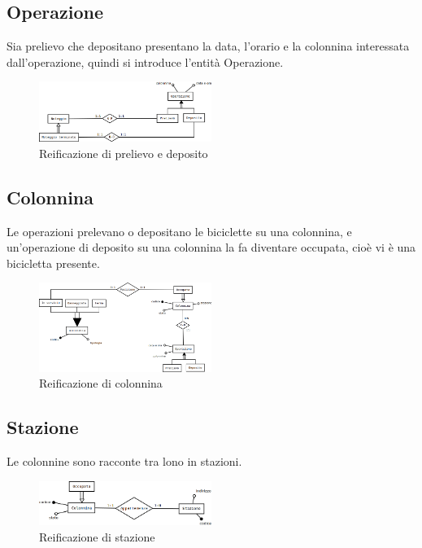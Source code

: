 \documentclass[a4paper,twoside]{article}
\begin{document}
\subsection{Operazione}
Sia prelievo che depositano presentano la data, l'orario e la colonnina interessata dall'operazione, quindi si introduce l'entità Operazione.
\begin{figure}[H]
 \centering
  \includegraphics[width=0.5\textwidth]{Immagini-Grafici/Concettuale07.png}
\caption{Reificazione di prelievo e deposito}
\end{figure}

\subsection{Colonnina}
Le operazioni prelevano o depositano le biciclette su una colonnina, e un'operazione di deposito su una colonnina la fa diventare occupata, cioè vi è una bicicletta presente.
\begin{figure}[H]
 \centering
  \includegraphics[width=0.5\textwidth]{Immagini-Grafici/Concettuale08.png}
\caption{Reificazione di colonnina}
\end{figure}

\subsection{Stazione}
Le colonnine sono racconte tra lono in stazioni.
\begin{figure}[H]
 \centering
  \includegraphics[width=0.5\textwidth]{Immagini-Grafici/Concettuale09.png}
\caption{Reificazione di stazione}
\end{figure}
\end{document}
